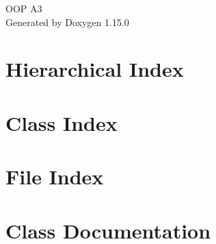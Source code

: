 \documentclass[twoside]{book}
\newcommand{\+}{\discretionary{\mbox{\scriptsize$\hookleftarrow$}}{}{}}
\newcommand{\clearemptydoublepage}{%
    \newpage{\pagestyle{empty}\cleardoublepage}%
  }
\begin{document}
  \raggedbottom
    \hypersetup{pageanchor=false,
                bookmarksnumbered=true,
                pdfencoding=unicode
               }
  \begin{titlepage}
  \vspace*{7cm}
  \begin{center}%
  {\Large OOP A3}\\
  \vspace*{1cm}
  {\large Generated by Doxygen 1.15.0}\\
  \end{center}
  \end{titlepage}
  \clearemptydoublepage
  \tableofcontents
  \clearemptydoublepage
  \hypersetup{pageanchor=true}

\chapter{Hierarchical Index}

\chapter{Class Index}

\chapter{File Index}

\chapter{Class Documentation}


































\end{document}
